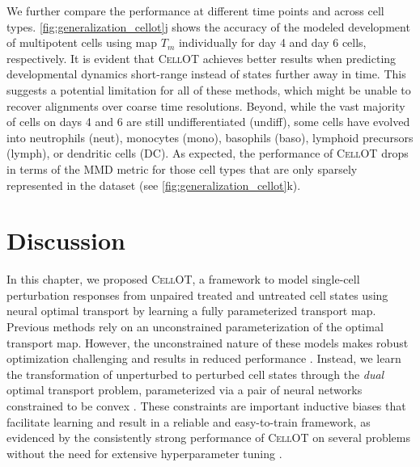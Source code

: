 We further compare the performance at different time points and across cell types.
\cref{fig:generalization_cellot}j shows the accuracy of the modeled development of multipotent cells using map $T_m$ individually for day 4 and day 6 cells, respectively. It is evident that \textsc{CellOT} achieves better results when predicting developmental dynamics short-range instead of states further away in time.
This suggests a potential limitation for all of these methods, which might be unable to recover alignments over coarse time resolutions.
Beyond, while the vast majority of cells on days 4 and 6 are still undifferentiated (undiff), some cells have evolved into neutrophils (neut), monocytes (mono), basophils (baso), lymphoid precursors (lymph), or dendritic cells (DC).
As expected, the performance of \textsc{CellOT} drops in terms of the \acrshort{MMD} metric for those cell types that are only sparsely represented in the dataset (see \cref{fig:generalization_cellot}k).

\section{Discussion}

In this chapter, we proposed \textsc{CellOT}, a framework to model single-cell perturbation responses from unpaired treated and untreated cell states using neural optimal transport by learning a fully parameterized transport map.
Previous methods \citep{rout2021generative, yang2018scalable, prasad2020optimal} rely on an unconstrained parameterization of the optimal transport map. However, the unconstrained nature of these models makes robust optimization challenging and results in reduced performance \citep[Table 1]{makkuva2020optimal}.
Instead, we learn the transformation of unperturbed to perturbed cell states through the \emph{dual} optimal transport problem, parameterized via a pair of neural networks constrained to be convex \citep{makkuva2020optimal}.
These constraints are important inductive biases that facilitate learning and result in a reliable and easy-to-train framework, as evidenced by the consistently strong performance of \textsc{CellOT} on several problems without the need for extensive hyperparameter tuning \citep[Online Methods]{bunne2021learning}. \\

